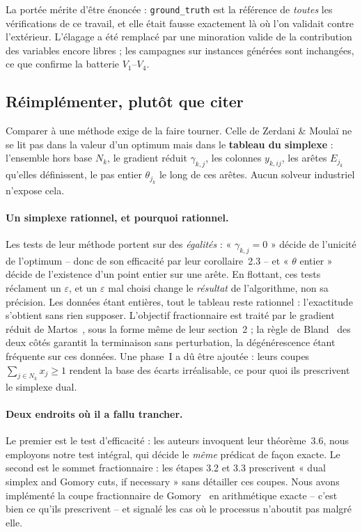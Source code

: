 \documentclass[11pt,a4paper]{article}
\theoremstyle{plain}
\theoremstyle{remark}
\begin{document}
La portée mérite d'être énoncée : \texttt{ground\_truth} est la référence de
\emph{toutes} les vérifications de ce travail, et elle était fausse
exactement là où l'on validait contre l'extérieur. L'élagage a été remplacé
par une minoration valide de la contribution des variables encore libres ;
les campagnes sur instances générées sont inchangées, ce que confirme la
batterie $V_1$--$V_4$.

\subsection{Réimplémenter, plutôt que citer}
\label{sec:reimpl}

Comparer à une méthode exige de la faire tourner. Celle de Zerdani \& Moulaï
ne se lit pas dans la valeur d'un optimum mais dans le \textbf{tableau du
simplexe} : l'ensemble hors base $N_k$, le gradient réduit $\gamma_{k,j}$,
les colonnes $y_{k,ij}$, les arêtes $E_{j_k}$ qu'elles définissent, le pas
entier $\theta_{j_k}$ le long de ces arêtes. Aucun solveur industriel
n'expose cela.

\paragraph{Un simplexe rationnel, et pourquoi rationnel.} Les tests de leur
méthode portent sur des \emph{égalités} : « $\gamma_{k,j}=0$ » décide de
l'unicité de l'optimum -- donc de son efficacité par leur corollaire~2.3 --
et « $\theta$ entier » décide de l'existence d'un point entier sur une
arête. En flottant, ces tests réclament un $\varepsilon$, et un $\varepsilon$
mal choisi change le \emph{résultat} de l'algorithme, non sa précision. Les
données étant entières, tout le tableau reste rationnel : l'exactitude
s'obtient sans rien supposer. L'objectif fractionnaire est traité par le
gradient réduit de Martos~\cite{martos1964,martos1975}, sous la forme même de
leur section~2 ; la règle
de Bland~\cite{bland1977} des deux côtés garantit la terminaison sans
perturbation, la
dégénérescence étant fréquente sur ces données. Une phase~I a dû être
ajoutée : leurs coupes $\sum_{j\in N_k}x_j\ge 1$ rendent la base des écarts
irréalisable, ce pour quoi ils prescrivent le simplexe dual.

\paragraph{Deux endroits où il a fallu trancher.} Le premier est le test
d'efficacité : les auteurs invoquent leur théorème~3.6, nous employons notre
test intégral, qui décide le \emph{même} prédicat de façon exacte. Le second
est le sommet fractionnaire : les étapes 3.2 et 3.3 prescrivent « dual
simplex and Gomory cuts, if necessary » sans détailler ces coupes. Nous
avons implémenté la coupe fractionnaire de Gomory~\cite{gomory1958} en
arithmétique exacte --
c'est bien ce qu'ils prescrivent -- et signalé les cas où le processus
n'aboutit pas malgré elle.
\end{document}
